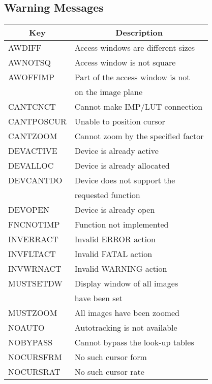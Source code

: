 \subsection{Warning Messages}
\begin{tabular}{|l|l|}
\hline
\multicolumn{1}{|c|}{Key}
&\multicolumn{1}{|c|}{Description}\\ \hline
AWDIFF & Access windows are different sizes\\
AWNOTSQ & Access window is not square\\
AWOFFIMP & Part of the access window is not\\
& on the image plane\\
CANTCNCT & Cannot make IMP/LUT connection\\
CANTPOSCUR & Unable to position cursor\\
CANTZOOM & Cannot zoom by the specified factor\\
DEVACTIVE & Device is already active\\
DEVALLOC & Device is already allocated\\
DEVCANTDO & Device does not support the\\
& requested function\\
DEVOPEN & Device is already open\\
FNCNOTIMP & Function not implemented\\
INVERRACT & Invalid ERROR action\\
INVFLTACT & Invalid FATAL action\\
INVWRNACT & Invalid WARNING action\\
MUSTSETDW & Display window of all images\\
& have been set\\
MUSTZOOM & All images have been zoomed\\
NOAUTO & Autotracking is not available\\
NOBYPASS & Cannot bypass the look-up tables\\
NOCURSFRM & No such cursor form\\
NOCURSRAT & No such cursor rate\\ 
\hline
\end{tabular}
